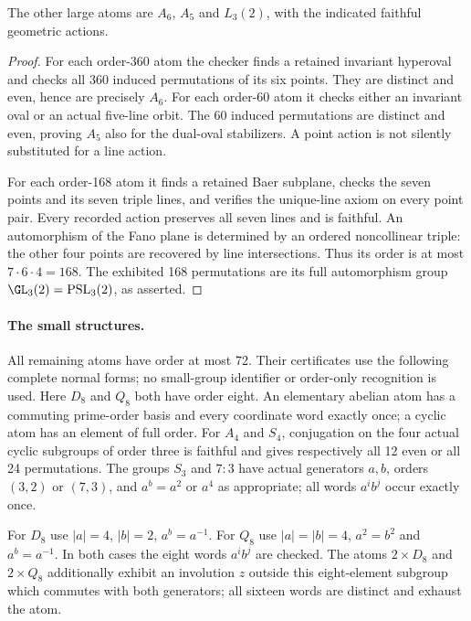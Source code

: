 \documentclass[11pt]{article}
\newcommand{\PSL}{\operatorname{PSL}}\newcommand{\SL}{\operatorname{SL}}
\begin{document}
\begin{lemma}\label{geometric}
The other large atoms are $A_6$, $A_5$ and $L_3(2)$, with the indicated
faithful geometric actions.
\end{lemma}
\begin{proof}
For each order-360 atom the checker finds a retained invariant hyperoval
and checks all 360 induced permutations of its six points. They are
distinct and even, hence are precisely $A_6$.
For each order-60 atom it checks either an invariant oval or an actual
five-line orbit. The 60 induced permutations are distinct and even,
proving $A_5$ also for the dual-oval stabilizers. A point action is not
silently substituted for a line action.

For each order-168 atom it finds a retained Baer subplane, checks the
seven points and its seven triple lines, and verifies the unique-line
axiom on every point pair. Every recorded action preserves all seven
lines and is faithful. An automorphism of the Fano plane is determined
by an ordered noncollinear triple: the other four points are recovered
by line intersections. Thus its order is at most $7\cdot6\cdot4=168$.
The exhibited 168 permutations are its full automorphism group
$\GL_3(2)=\PSL_3(2)$, as asserted.
\end{proof}

\paragraph{The small structures.}
All remaining atoms have order at most 72. Their certificates use the
following complete normal forms; no small-group identifier or order-only
recognition is used. Here $D_8$ and $Q_8$ both have order eight.
An elementary abelian atom has a commuting prime-order basis and every
coordinate word exactly once; a cyclic atom has an element of full order.
For $A_4$ and $S_4$, conjugation on the four actual cyclic subgroups of
order three is faithful and gives respectively all 12 even or all 24
permutations. The groups $S_3$ and $7:3$ have actual generators $a,b$,
orders $(3,2)$ or $(7,3)$, and $a^b=a^2$ or $a^4$ as appropriate;
all words $a^ib^j$ occur exactly once.

For $D_8$ use $|a|=4$, $|b|=2$, $a^b=a^{-1}$.
For $Q_8$ use $|a|=|b|=4$, $a^2=b^2$ and $a^b=a^{-1}$.
In both cases the eight words $a^ib^j$ are checked.
The atoms $2\times D_8$ and $2\times Q_8$ additionally exhibit an
involution $z$ outside this eight-element subgroup which commutes with
both generators; all sixteen words are distinct and exhaust the atom.
\end{document}
